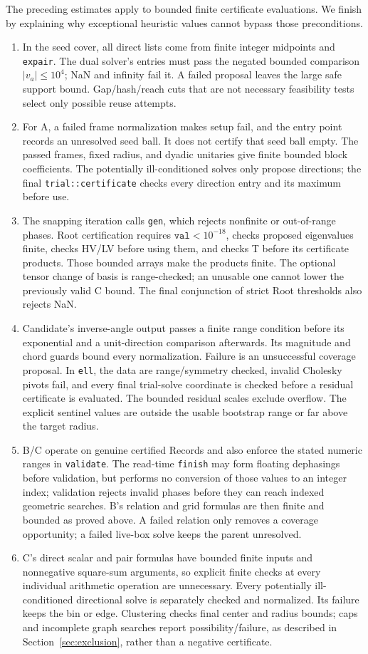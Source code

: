 The preceding estimates apply to bounded finite certificate
evaluations.  We finish by explaining why exceptional heuristic
values cannot bypass those preconditions.
\begin{enumerate}
\item
In the seed cover, all direct lists come from finite integer
midpoints and \texttt{expair}.  The dual solver's entries must pass
the negated bounded comparison $|v_a|\le10^4$; NaN and infinity
fail it.  A failed proposal leaves the large safe support bound.
Gap/hash/reach cuts that are not necessary feasibility tests select
only possible reuse attempts.
\item
For A, a failed frame normalization makes setup fail, and the
entry point records an unresolved seed ball.  It does not certify
that seed ball empty.  The passed frames, fixed radius, and dyadic
unitaries give finite bounded block coefficients.  The potentially
ill-conditioned solves only propose directions; the final
\texttt{trial::certificate} checks every direction entry and its
maximum before use.
\item
The snapping iteration calls \texttt{gen}, which rejects
nonfinite or out-of-range phases.  Root certification requires
$\mathtt{val}<10^{-18}$, checks proposed eigenvalues finite,
checks HV/LV before using them, and checks T before its certificate
products.  Those bounded arrays make the products finite.
The optional tensor change of basis is range-checked; an unusable
one cannot lower the previously valid C bound.
The final conjunction of strict Root thresholds also rejects NaN.
\item
Candidate's inverse-angle output passes a finite range condition
before its exponential and a unit-direction comparison afterwards.
Its magnitude and chord guards bound every normalization.
Failure is an unsuccessful coverage proposal.
In \texttt{ell}, the data are range/symmetry checked, invalid
Cholesky pivots fail, and every final trial-solve coordinate is
checked before a residual certificate is evaluated.
The bounded residual scales exclude overflow.
The explicit sentinel values are outside the usable bootstrap
range or far above the target radius.
\item
B/C operate on genuine certified Records and also enforce the
stated numeric ranges in \texttt{validate}.
The read-time \texttt{finish} may form floating dephasings before
validation, but performs no conversion of those values to an
integer index; validation rejects invalid phases before they can
reach indexed geometric searches.
B's relation and grid formulas are then finite and bounded as
proved above.  A failed relation only removes a coverage
opportunity; a failed live-box solve keeps the parent unresolved.
\item
C's direct scalar and pair formulas have bounded finite inputs
and nonnegative square-sum arguments, so explicit finite checks at
every individual arithmetic operation are unnecessary.
Every potentially ill-conditioned directional solve is separately
checked and normalized.  Its failure keeps the bin or edge.
Clustering checks final center and radius bounds; caps and
incomplete graph searches report possibility/failure, as described
in Section~\ref{sec:exclusion}, rather than a negative certificate.
\end{enumerate}

